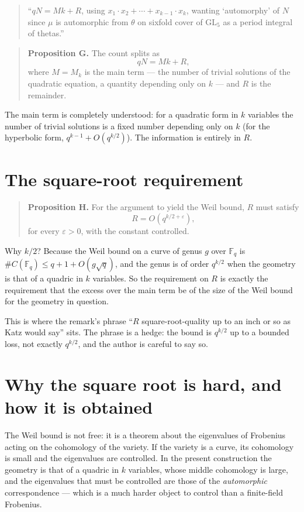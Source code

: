 \begin{quote}
\small
``$qN = Mk + R$, using $x_1\cdot x_2 + \cdots + x_{k-1}\cdot x_k$, wanting
`automorphy' of $N$ since $\mu$ is automorphic from $\theta$ on sixfold cover
of $\mathrm{GL}_5$ as a period integral of thetas.''
\end{quote}

\begin{quote}
\textbf{Proposition G.} The count splits as
\[
qN = Mk + R,
\]
where $M = M_k$ is the main term --- the number of trivial solutions of the
quadratic equation, a quantity depending only on $k$ --- and $R$ is the
remainder.
\end{quote}

The main term is completely understood: for a quadratic form in $k$ variables
the number of trivial solutions is a fixed number depending only on $k$ (for
the hyperbolic form, $q^{k-1} + O(q^{k/2})$). The information is entirely in
$R$.

\section{The square-root requirement}\begin{quote}
\textbf{Proposition H.} For the argument to yield the Weil bound, $R$ must
satisfy
\[
R = O\!\left(q^{k/2+\varepsilon}\right),
\]
for every $\varepsilon > 0$, with the constant controlled.
\end{quote}

Why $k/2$? Because the Weil bound on a curve of genus $g$ over $\mathbb{F}_q$ is
$\#C(\mathbb{F}_q) \le q + 1 + O(g\sqrt q)$, and the genus is of order
$q^{k/2}$ when the geometry is that of a quadric in $k$ variables. So the
requirement on $R$ is exactly the requirement that the excess over the main
term be of the size of the Weil bound for the geometry in question.

This is where the remark's phrase ``$R$ square-root-quality up to an inch or
so as Katz would say'' sits. The phrase is a hedge: the bound is
$q^{k/2}$ up to a bounded loss, not exactly $q^{k/2}$, and the author is
careful to say so.

\section{Why the square root is hard, and how it is obtained}The Weil bound is not free: it is a theorem about the eigenvalues of Frobenius
acting on the cohomology of the variety. If the variety is a curve, its
cohomology is small and the eigenvalues are controlled. In the present
construction the geometry is that of a quadric in $k$ variables, whose
middle cohomology is large, and the eigenvalues that must be controlled are
those of the \emph{automorphic} correspondence --- which is a much harder
object to control than a finite-field Frobenius.

